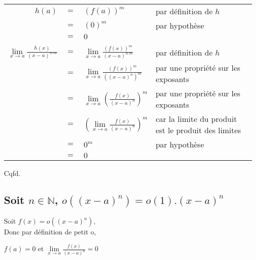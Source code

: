 \documentclass[a4paper,11pt]{report}
\begin{document}
\begin{center}
\begin{tabular}{rcll}
$h(a)$ & $=$ & $(f(a))^m$ & par définition de $h$\\
& $=$ & $(0)^m$ & par hypothèse \\
& $=$ & $0$ &\\
&&& \\
$\lim\limits_{x \rightarrow a}{\frac{h(x)}{(x-a)^{n.m}}}$ & $=$ & $\lim\limits_{x \rightarrow a}{\frac{(f(x))^m}{(x-a)^{n.m}}}$ & par définition de $h$\\
& $=$ & $\lim\limits_{x \rightarrow a}{\frac{(f(x))^m}{((x-a)^n)^m}}$ & par une propriété sur les exposants\\
& $=$ & $\lim\limits_{x \rightarrow a}{(\frac{f(x)}{(x-a)^n})^m}$ & par une propriété sur les exposants\\
& $=$ & $(\lim\limits_{x \rightarrow a}{\frac{f(x)}{(x-a)^n}})^m$ & car la limite du produit est le produit des limites\\
& $=$ & $0^m$ & par hypothèse\\
& $=$ & $0$ & \\
\end{tabular}
\end{center}
Cqfd.

\subsection{Soit $n \in \mathbb{N}$, $o((x-a)^n) = o(1).(x-a)^n$}
Soit $f(x) = o((x-a)^n)$,\\
Donc par définition de petit o,
\begin{center}
	$f(a) = 0$ et $\lim\limits_{x \rightarrow a}{\frac{f(x)}{(x-a)^n} = 0}$
\end{center}
\end{document}
